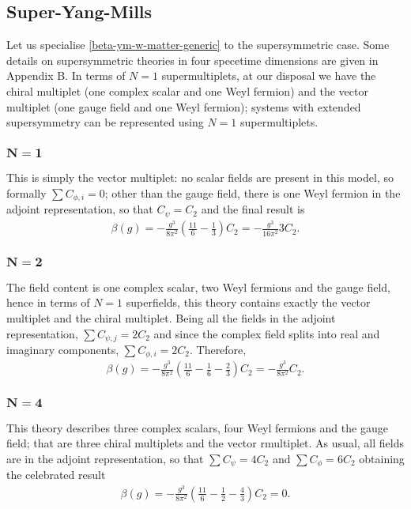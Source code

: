 \subsection{Super-Yang-Mills}

Let us specialise \eqref{beta-ym-w-matter-generic} to the supersymmetric case. Some details on supersymmetric theories in four specetime dimensions are given in Appendix B. In terms of $N=1$ supermultiplets, at our disposal we have the chiral multiplet (one complex scalar and one Weyl fermion) and the vector multiplet (one gauge field and one Weyl fermion); systems with extended supersymmetry can be represented using $N=1$ supermultiplets.

\subsubsection{$\boldsymbol { N = 1} $ \sym}
This is simply the vector multiplet: no scalar fields are present in this model, so formally $\sum C_{\phi,i} = 0 $; other than the gauge field, there is one Weyl fermion in the adjoint representation, so that $C_{\psi} = C_2$ and the final result is
\begin{align}
\beta(g) = - \frac{g^3}{8 \pi^2} \left(
	\frac{11}{6} 
	- \frac{1}{3}
	\right)C_2 
= - \frac{g^3}{16 \pi^2} 3C_2 .
\end{align}

\subsubsection{$\boldsymbol { N = 2 } $ \sym}
The field content is one complex scalar, two Weyl fermions and the gauge field, hence in terms of $N=1$ superfields, this theory contains exactly the vector multiplet and the chiral multiplet. Being all the fields  in the adjoint representation,  $\sum C_{\psi,j} = 2 C_2 $ and since the complex field splits into real and imaginary components, $\sum C_{\phi,i} = 2 C_2$. Therefore,
\begin{align}
\beta(g) = - \frac{g^3}{8 \pi^2} \left(
	\frac{11}{6}
	- \frac{1 }{6} 
	- \frac{2}{3}
	\right) C_2 
= - \frac{g^3}{8 \pi^2} C_2  .
\end{align}


\subsubsection{$\boldsymbol { N = 4} $ \sym}
This theory describes three complex scalars, four Weyl fermions and the gauge field; that are three chiral multiplets and the vector rmultiplet.
As usual, all fields are in the adjoint representation, so that $\sum C_\psi = 4 C_2 $ and $\sum C_\phi = 6 C_2$ obtaining the celebrated result
\begin{align}
\beta(g) = - \frac{g^3}{8 \pi^2} \left(
	\frac{11}{6}
	- \frac{1}{2}
	-  \frac{4}{3}
	\right) C_2 
	= 0.
\end{align}




